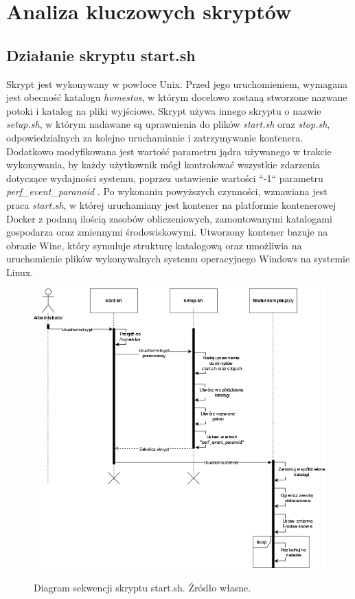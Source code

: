 \section{Analiza kluczowych skryptów}
\subsection{Działanie skryptu start.sh}
\indent Skrypt jest wykonywany w powłoce Unix. Przed jego uruchomieniem, wymagana jest obecność katalogu \textit{\/home\/stos}, w którym docelowo zostaną stworzone nazwane potoki i katalog na pliki wyjściowe. Skrypt używa innego skryptu o nazwie \textit{setup.sh}, w którym nadawane są uprawnienia do plików \textit{start.sh} oraz \textit{stop.sh}, odpowiedzialnych za kolejno uruchamianie i zatrzymywanie kontenera. Dodatkowo modyfikowana jest wartość parametru jądra używanego w trakcie wykonywania, by każdy użytkownik mógł kontrolować wszystkie zdarzenia dotyczące wydajności systemu, poprzez ustawienie wartości “-1“ parametru \textit{perf\_event\_paranoid} \cite{perf}. Po wykonaniu powyższych czynności, wznawiana jest praca \textit{start.sh}, w której uruchamiany jest kontener na platformie kontenerowej Docker z podaną ilością zasobów obliczeniowych, zamontowanymi katalogami gospodarza oraz zmiennymi środowiskowymi. Utworzony kontener bazuje na obrazie Wine, który symuluje strukturę katalogową oraz umożliwia na uruchomienie plików wykonywalnych systemu operacyjnego Windows na systemie Linux.
\begin{figure}[!h]
	\begin{center}
		\resizebox{1.0\textwidth}{!} {
			\includegraphics{img/2/start.png}
		}
		\caption[Diagram sekwenji skryptu start.sh]{Diagram sekwencji skryptu start.sh. Źródło własne.}
	\end{center}
\end{figure}

